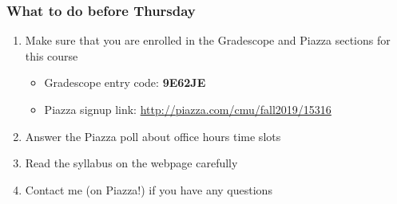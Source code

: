 \documentclass[10pt,handout]{beamer}
\begin{document}

\begin{frame}

\frametitle{What to do before Thursday}

\begin{enumerate}
  \item Make sure that you are enrolled in the Gradescope and Piazza sections for this course
  \begin{itemize}
    \item Gradescope entry code: \textbf{9E62JE}
    \item Piazza signup link: \url{http://piazza.com/cmu/fall2019/15316}
  \end{itemize}
  \item Answer the Piazza poll about office hours time slots
  \item Read the syllabus on the webpage carefully
  \item Contact me (on Piazza!) if you have any questions
\end{enumerate}

\end{frame}
\end{document}
